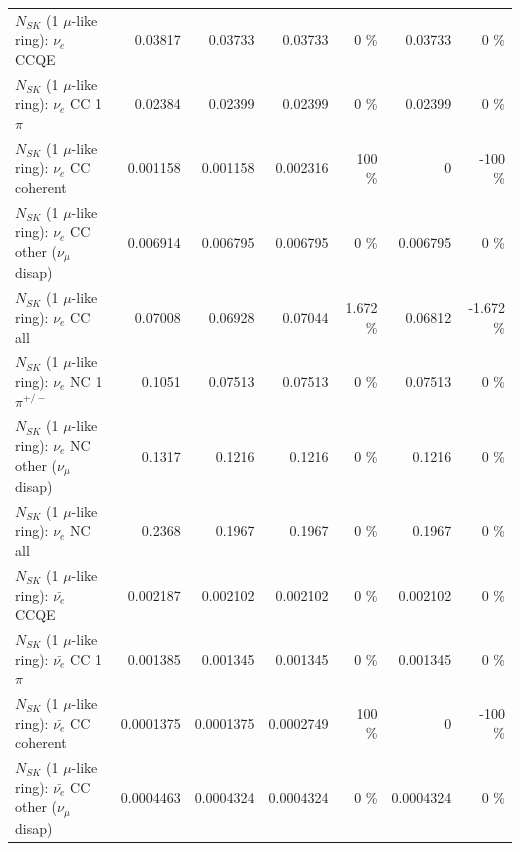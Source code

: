 \begin{table}
\begin{tabular}{| l | r | r | r  r | r  r |}
\hline
\hline
\hline
                                      $N_{SK}$ (1 $\mu$-like ring): $\nu_e$ CCQE &         0.03817 &         0.03733 &         0.03733 &        0 \%  &         0.03733 &        0 \%  \\ 
                                 $N_{SK}$ (1 $\mu$-like ring): $\nu_e$ CC 1$\pi$ &         0.02384 &         0.02399 &         0.02399 &        0 \%  &         0.02399 &        0 \%  \\ 
                               $N_{SK}$ (1 $\mu$-like ring): $\nu_e$ CC coherent &        0.001158 &        0.001158 &        0.002316 &      100 \%  &               0 &     -100 \%  \\ 
                $N_{SK}$ (1 $\mu$-like ring): $\nu_e$ CC other ($\nu_\mu$ disap) &        0.006914 &        0.006795 &        0.006795 &        0 \%  &        0.006795 &        0 \%  \\ 
                                  $N_{SK}$ (1 $\mu$-like ring): $\nu_{e}$ CC all &         0.07008 &         0.06928 &         0.07044 &    1.672 \%  &         0.06812 &   -1.672 \%  \\ 
\hline
                           $N_{SK}$ (1 $\mu$-like ring): $\nu_e$ NC 1$\pi^{+/-}$ &          0.1051 &         0.07513 &         0.07513 &        0 \%  &         0.07513 &        0 \%  \\ 
                $N_{SK}$ (1 $\mu$-like ring): $\nu_e$ NC other ($\nu_\mu$ disap) &          0.1317 &          0.1216 &          0.1216 &        0 \%  &          0.1216 &        0 \%  \\ 
                                  $N_{SK}$ (1 $\mu$-like ring): $\nu_{e}$ NC all &          0.2368 &          0.1967 &          0.1967 &        0 \%  &          0.1967 &        0 \%  \\ 
\hline
\hline
\hline
                                $N_{SK}$ (1 $\mu$-like ring): $\bar{\nu_e}$ CCQE &        0.002187 &        0.002102 &        0.002102 &        0 \%  &        0.002102 &        0 \%  \\ 
                           $N_{SK}$ (1 $\mu$-like ring): $\bar{\nu_e}$ CC 1$\pi$ &        0.001385 &        0.001345 &        0.001345 &        0 \%  &        0.001345 &        0 \%  \\ 
                         $N_{SK}$ (1 $\mu$-like ring): $\bar{\nu_e}$ CC coherent &       0.0001375 &       0.0001375 &       0.0002749 &      100 \%  &               0 &     -100 \%  \\ 
          $N_{SK}$ (1 $\mu$-like ring): $\bar{\nu_e}$ CC other ($\nu_\mu$ disap) &       0.0004463 &       0.0004324 &       0.0004324 &        0 \%  &       0.0004324 &        0 \%  \\ 

\end{tabular}
\end{table}
